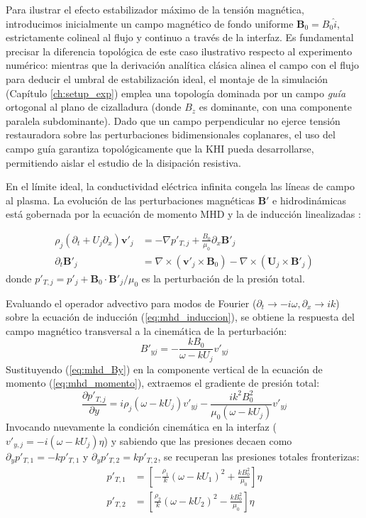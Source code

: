 \primerparrafo  Para ilustrar el efecto estabilizador máximo de la tensión magnética, introducimos inicialmente un campo magnético de fondo uniforme $\mathbf{B}_0 = B_0 \hat{i}$, estrictamente colineal al flujo y continuo a través de la interfaz. Es fundamental precisar la diferencia topológica de este caso ilustrativo respecto al experimento numérico: mientras que la derivación analítica clásica alinea el campo con el flujo para deducir el umbral de estabilización ideal, el montaje de la simulación (Capítulo \ref{ch:setup_exp}) emplea una topología dominada por un campo \textit{guía} ortogonal al plano de cizalladura (donde $B_z$ es dominante, con una componente paralela subdominante). Dado que un campo perpendicular no ejerce tensión restauradora sobre las perturbaciones bidimensionales coplanares, el uso del campo guía garantiza topológicamente que la KHI pueda desarrollarse, permitiendo aislar el estudio de la disipación resistiva.

En el límite ideal, la conductividad eléctrica infinita congela las líneas de campo al plasma. La evolución de las perturbaciones magnéticas $\mathbf{B}'$ e hidrodinámicas está gobernada por la ecuación de momento MHD y la de inducción linealizadas \parencite{acheson-1990}:

\begin{align}
    \rho_j (\partial_t + U_j \partial_x) \mathbf{v}'_j &= -\nabla p'_{T,j} + \frac{B_0}{\mu_0} \partial_x \mathbf{B}'_j \label{eq:mhd_momento} \\
    \partial_t \mathbf{B}'_j &= \nabla \times (\mathbf{v}'_j \times \mathbf{B}_0) - \nabla \times (\mathbf{U}_j \times \mathbf{B}'_j) \label{eq:mhd_induccion}
\end{align}
donde $p'_{T,j} = p'_j + \mathbf{B}_0 \cdot \mathbf{B}'_j / \mu_0$ es la perturbación de la presión total. 

Evaluando el operador advectivo para modos de Fourier ($\partial_t \to -i\omega, \partial_x \to ik$) sobre la ecuación de inducción (\ref{eq:mhd_induccion}), se obtiene la respuesta del campo magnético transversal a la cinemática de la perturbación:
\begin{equation}
    B'_{yj} = -\frac{k B_0}{\omega - k U_j} v'_{yj}
    \label{eq:mhd_By}
\end{equation}
Sustituyendo (\ref{eq:mhd_By}) en la componente vertical de la ecuación de momento (\ref{eq:mhd_momento}), extraemos el gradiente de presión total:
\begin{equation}
    \frac{\partial p'_{T,j}}{\partial y} = i \rho_j (\omega - k U_j) v'_{yj} - \frac{i k^2 B_0^2}{\mu_0 (\omega - k U_j)} v'_{yj}
\end{equation}
Invocando nuevamente la condición cinemática en la interfaz ($v'_{y,j} = -i(\omega - k U_j)\eta$) y sabiendo que las presiones decaen como $\partial_y p'_{T,1} = -k p'_{T,1}$ y $\partial_y p'_{T,2} = k p'_{T,2}$, se recuperan las presiones totales fronterizas:
\begin{align}
    p'_{T,1} &= \left[ -\frac{\rho_1}{k} (\omega - k U_1)^2 + \frac{k B_0^2}{\mu_0} \right] \eta \\
    p'_{T,2} &= \left[ \frac{\rho_2}{k} (\omega - k U_2)^2 - \frac{k B_0^2}{\mu_0} \right] \eta
\end{align}


